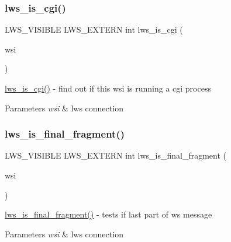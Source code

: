 \subsubsection{\texorpdfstring{lws\+\_\+is\+\_\+cgi()}{lws\_is\_cgi()}}
{\footnotesize\ttfamily L\+W\+S\+\_\+\+V\+I\+S\+I\+B\+LE L\+W\+S\+\_\+\+E\+X\+T\+E\+RN int lws\+\_\+is\+\_\+cgi (\begin{DoxyParamCaption}\item[{struct \hyperlink{structlws}{lws} $\ast$}]{wsi }\end{DoxyParamCaption})}

\hyperlink{group__wsstatus_ga4ad226d5e01024b4046f4a5a37199aa1}{lws\+\_\+is\+\_\+cgi()} -\/ find out if this wsi is running a cgi process 
\begin{DoxyParams}{Parameters}
{\em wsi} & lws connection \\
\hline
\end{DoxyParams}
\mbox{\label{group__wsstatus_ga08e9ee165fca503fd9427d55cfecac37}} 
\subsubsection{\texorpdfstring{lws\+\_\+is\+\_\+final\+\_\+fragment()}{lws\_is\_final\_fragment()}}
{\footnotesize\ttfamily L\+W\+S\+\_\+\+V\+I\+S\+I\+B\+LE L\+W\+S\+\_\+\+E\+X\+T\+E\+RN int lws\+\_\+is\+\_\+final\+\_\+fragment (\begin{DoxyParamCaption}\item[{struct \hyperlink{structlws}{lws} $\ast$}]{wsi }\end{DoxyParamCaption})}

\hyperlink{group__wsstatus_ga08e9ee165fca503fd9427d55cfecac37}{lws\+\_\+is\+\_\+final\+\_\+fragment()} -\/ tests if last part of ws message


\begin{DoxyParams}{Parameters}
{\em wsi} & lws connection \\
\hline
\end{DoxyParams}
\mbox{\label{group__wsstatus_gaa931caf68b8efb5dc148ae94e54cbd51}} 
